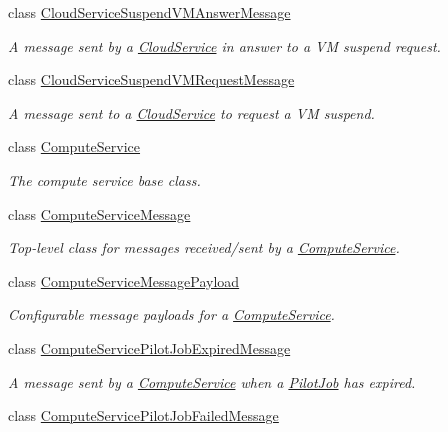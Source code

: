 \begin{DoxyCompactItemize}
class \hyperlink{classwrench_1_1_cloud_service_suspend_v_m_answer_message}{Cloud\+Service\+Suspend\+V\+M\+Answer\+Message}
\begin{DoxyCompactList}\small\item\em A message sent by a \hyperlink{classwrench_1_1_cloud_service}{Cloud\+Service} in answer to a VM suspend request. \end{DoxyCompactList}\item 
class \hyperlink{classwrench_1_1_cloud_service_suspend_v_m_request_message}{Cloud\+Service\+Suspend\+V\+M\+Request\+Message}
\begin{DoxyCompactList}\small\item\em A message sent to a \hyperlink{classwrench_1_1_cloud_service}{Cloud\+Service} to request a VM suspend. \end{DoxyCompactList}\item 
class \hyperlink{classwrench_1_1_compute_service}{Compute\+Service}
\begin{DoxyCompactList}\small\item\em The compute service base class. \end{DoxyCompactList}\item 
class \hyperlink{classwrench_1_1_compute_service_message}{Compute\+Service\+Message}
\begin{DoxyCompactList}\small\item\em Top-\/level class for messages received/sent by a \hyperlink{classwrench_1_1_compute_service}{Compute\+Service}. \end{DoxyCompactList}\item 
class \hyperlink{classwrench_1_1_compute_service_message_payload}{Compute\+Service\+Message\+Payload}
\begin{DoxyCompactList}\small\item\em Configurable message payloads for a \hyperlink{classwrench_1_1_compute_service}{Compute\+Service}. \end{DoxyCompactList}\item 
class \hyperlink{classwrench_1_1_compute_service_pilot_job_expired_message}{Compute\+Service\+Pilot\+Job\+Expired\+Message}
\begin{DoxyCompactList}\small\item\em A message sent by a \hyperlink{classwrench_1_1_compute_service}{Compute\+Service} when a \hyperlink{classwrench_1_1_pilot_job}{Pilot\+Job} has expired. \end{DoxyCompactList}\item 
class \hyperlink{classwrench_1_1_compute_service_pilot_job_failed_message}{Compute\+Service\+Pilot\+Job\+Failed\+Message}

\end{DoxyCompactItemize}
